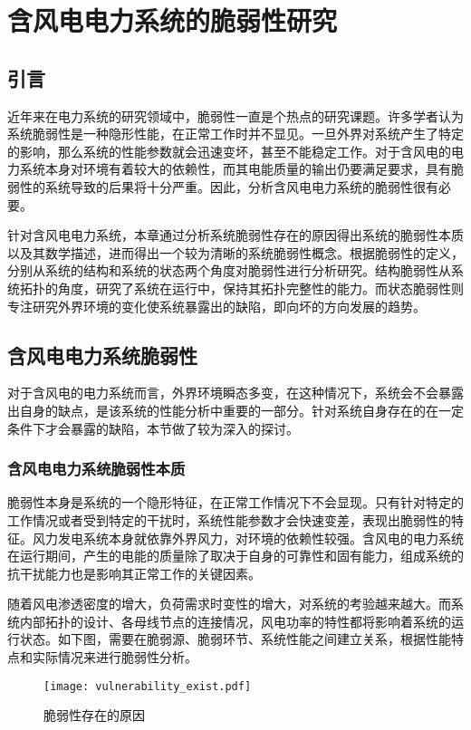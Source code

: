 \chapter{含风电电力系统的脆弱性研究}
\label{cha:theory}

\section{引言}
\label{sec:index3}
近年来在电力系统的研究领域中，脆弱性一直是个热点的研究课题。许多学者认为系统脆弱性是一种隐形性能，在正常工作时并不显见。一旦外界对系统产生了特定的影响，那么系统的性能参数就会迅速变坏，甚至不能稳定工作。对于含风电的电力系统本身对环境有着较大的依赖性，而其电能质量的输出仍要满足要求，具有脆弱性的系统导致的后果将十分严重。因此，分析含风电电力系统的脆弱性很有必要。

针对含风电电力系统，本章通过分析系统脆弱性存在的原因得出系统的脆弱性本质以及其数学描述，进而得出一个较为清晰的系统脆弱性概念。根据脆弱性的定义，分别从系统的结构和系统的状态两个角度对脆弱性进行分析研究。结构脆弱性从系统拓扑的角度，研究了系统在运行中，保持其拓扑完整性的能力。而状态脆弱性则专注研究外界环境的变化使系统暴露出的缺陷，即向坏的方向发展的趋势。

\section{含风电电力系统脆弱性}
\label{sec:defina}
对于含风电的电力系统而言，外界环境瞬态多变，在这种情况下，系统会不会暴露出自身的缺点，是该系统的性能分析中重要的一部分。针对系统自身存在的在一定条件下才会暴露的缺陷，本节做了较为深入的探讨。
\subsection{含风电电力系统脆弱性本质}
\label{sec:network}
脆弱性本身是系统的一个隐形特征，在正常工作情况下不会显现。只有针对特定的工作情况或者受到特定的干扰时，系统性能参数才会快速变差，表现出脆弱性的特征。风力发电系统本身就依靠外界风力，对环境的依赖性较强。含风电的电力系统在运行期间，产生的电能的质量除了取决于自身的可靠性和固有能力，组成系统的抗干扰能力也是影响其正常工作的关键因素。

随着风电渗透密度的增大，负荷需求时变性的增大，对系统的考验越来越大。而系统内部拓扑的设计、各母线节点的连接情况，风电功率的特性都将影响着系统的运行状态。如下图，需要在脆弱源、脆弱环节、系统性能之间建立关系，根据性能特点和实际情况来进行脆弱性分析。
\begin{figure}[H] %
  \centering
  \texttt{[image: vulnerability\_exist.pdf]}
  \caption{脆弱性存在的原因}
  \label{fig:vulnerability_exist}
\end{figure}

